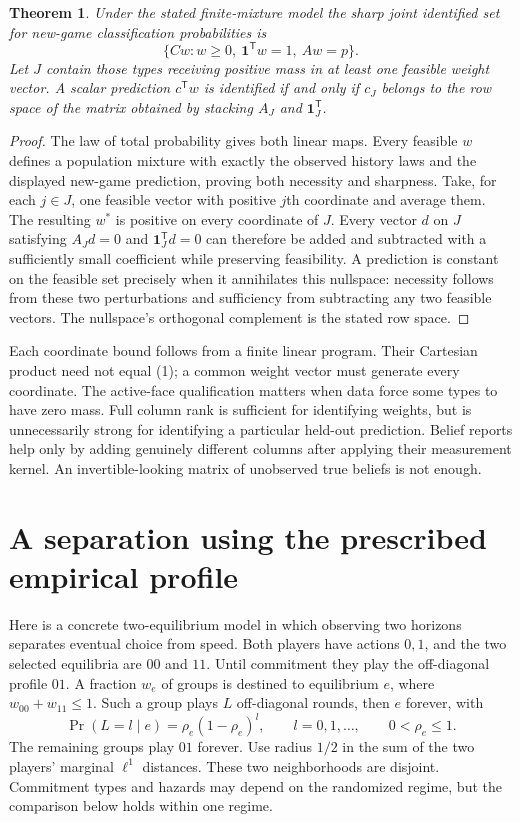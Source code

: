 \documentclass[11pt]{article}
\newtheorem{theorem}{Theorem}
\theoremstyle{definition}
\begin{document}
\begin{theorem}
Under the stated finite-mixture model the sharp joint identified set for
new-game classification probabilities is
\[
 \{Cw:w\ge0,\ \mathbf1^{\mathsf T}w=1,\ Aw=p\}.                 \tag{1}
\]
Let $J$ contain those types receiving positive mass in at least one feasible
weight vector. A scalar prediction $c^{\mathsf T}w$ is identified if and
only if $c_J$ belongs to the row space of the matrix obtained by stacking
$A_J$ and $\mathbf1_J^{\mathsf T}$.
\end{theorem}
\begin{proof}
The law of total probability gives both linear maps. Every feasible $w$
defines a population mixture with exactly the observed history laws and
the displayed new-game prediction, proving both necessity and sharpness.
Take, for each $j\in J$, one feasible vector with positive $j$th coordinate
and average them. The resulting $w^*$ is positive on every coordinate of
$J$. Every vector $d$ on $J$ satisfying $A_Jd=0$ and
$\mathbf1_J^{\mathsf T}d=0$ can therefore be added and subtracted with a
sufficiently small coefficient while preserving feasibility. A prediction
is constant on the feasible set precisely when it annihilates this
nullspace: necessity follows from these two perturbations and sufficiency
from subtracting any two feasible vectors. The nullspace's orthogonal
complement is the stated row space.
\end{proof}
Each coordinate bound follows from a finite linear program. Their Cartesian
product need not equal (1); a common weight vector must generate every
coordinate. The active-face qualification matters when data force some
types to have zero mass. Full column rank is sufficient for identifying
weights, but is unnecessarily strong for identifying a particular held-out
prediction. Belief reports help only by adding genuinely different columns
after applying their measurement kernel. An invertible-looking matrix of
unobserved true beliefs is not enough.

\section*{A separation using the prescribed empirical profile}
Here is a concrete two-equilibrium model in which observing two horizons
separates eventual choice from speed. Both players have actions $0,1$,
and the two selected equilibria are $00$ and $11$. Until commitment they
play the off-diagonal profile $01$. A fraction $w_e$ of groups is destined
to equilibrium $e$, where $w_{00}+w_{11}\le1$. Such a group plays $L$
off-diagonal rounds, then $e$ forever, with
\[
 \Pr(L=l\mid e)=\rho_e(1-\rho_e)^l,
 \qquad l=0,1,\ldots,\qquad 0<\rho_e\le1.
\]
The remaining groups play $01$ forever. Use radius $1/2$ in the sum of
the two players' marginal $\ell^1$ distances. These two neighborhoods
are disjoint. Commitment types and hazards may depend on the randomized
regime, but the comparison below holds within one regime.
\end{document}
